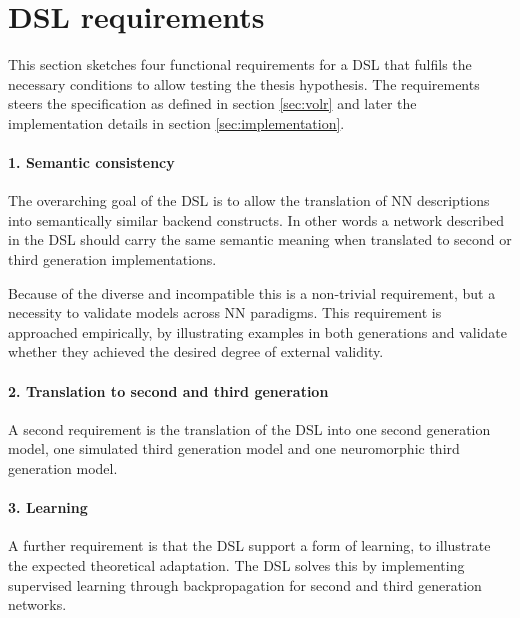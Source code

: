 \documentclass[report.tex]{subfiles}
\begin{document}
%
%

\section{DSL requirements} \label{sec:requirements}
This section sketches four functional requirements for a \gls{DSL} that 
fulfils the necessary conditions to allow testing the thesis hypothesis.
The requirements steers the specification as defined in section 
\ref{sec:volr} and later the implementation details in section
\ref{sec:implementation}.

\paragraph{1. Semantic consistency}
The overarching goal of the \gls{DSL} is to allow the translation 
of \gls{NN} descriptions into semantically similar backend constructs.
In other words a network described in the \gls{DSL} should carry
the same semantic meaning when translated to second or third generation
implementations. 

Because of the diverse and incompatible this is a non-trivial requirement,
but a necessity to validate models across \gls{NN} paradigms.
This requirement is approached empirically, by illustrating examples in
both generations and validate whether they achieved the desired degree
of external validity.

\paragraph{2. Translation to second and third generation}
A second requirement is the translation of the \gls{DSL} into
one second generation model, one simulated third generation model
and one neuromorphic third generation model.

\paragraph{3. Learning}
A further requirement is that the \gls{DSL} support a form of
learning, to illustrate the expected theoretical adaptation.
The \gls{DSL} solves this by implementing supervised 
learning through backpropagation  for second
and third generation networks.
\end{document}
